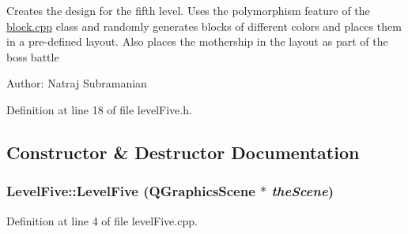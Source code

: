Creates the design for the fifth level. Uses the polymorphism feature of the \hyperlink{block_8cpp}{block.cpp} class and randomly generates blocks of different colors and places them in a pre-\/defined layout. Also places the mothership in the layout as part of the boss battle

Author: Natraj Subramanian 

Definition at line 18 of file levelFive.h.

\subsection{Constructor \& Destructor Documentation}
\hypertarget{class_level_five_abbd9665cd046830beb552b2632d5c400}{
\subsubsection[{LevelFive}]{\setlength{\rightskip}{0pt plus 5cm}LevelFive::LevelFive (QGraphicsScene $\ast$ {\em theScene})}}
\label{class_level_five_abbd9665cd046830beb552b2632d5c400}


Definition at line 4 of file levelFive.cpp.


